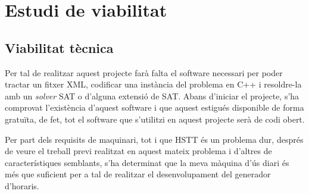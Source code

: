 \documentclass[11pt,a4paper,twoside]{report}
\begin{document}
  \chapter{Estudi de viabilitat}

  \section{Viabilitat tècnica}

  Per tal de realitzar aquest projecte farà falta el software necessari per poder tractar un fitxer XML, codificar una instància del problema en C++ i resoldre-la amb un \textit{solver} SAT o d'alguna extensió de SAT. 
  Abans d'iniciar el projecte, s'ha comprovat l'existència d'aquest software i que aquest estigués disponible de forma gratuïta, de fet, tot el software que s'utilitzi en aquest projecte serà de codi obert.

  Per part dels requisits de maquinari, tot i que HSTT és un problema dur, 
  després de veure el treball previ realitzat en aquest mateix problema i d'altres de característiques semblants, s'ha determinat que la meva màquina d'ús diari és més que suficient per a tal de realitzar el desenvolupament del generador d'horaris.
\end{document}
